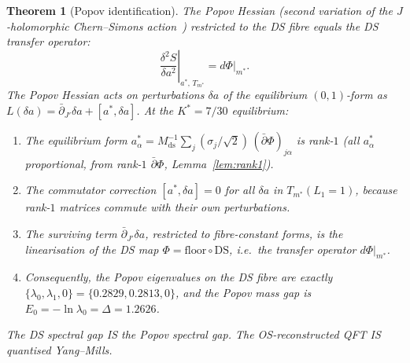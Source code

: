 \documentclass[11pt,a4paper]{article}
\newtheorem{theorem}{Theorem}[section]
\theoremstyle{definition}
\theoremstyle{remark}
\newcommand{\dbar}{\bar{\partial}}
\begin{document}
\begin{theorem}[Popov identification]\label{thm:popov_identification}
The Popov Hessian (second variation of the $J$-holomorphic Chern--Simons action~\cite{Popov2021}) restricted to the DS fibre equals the DS transfer operator:
\[
\left.\frac{\delta^2 S}{\delta a^2}\right|_{a^*,\,T_{m^*}} = d\Phi\big|_{m^*}.
\]
The Popov Hessian acts on perturbations $\delta a$ of the equilibrium $(0,1)$-form as $L(\delta a)=\dbar_{J'}\delta a+[a^*,\delta a]$. At the $K^*=7/30$ equilibrium:
\begin{enumerate}[nosep]
\item The equilibrium form $a^*_\alpha=M_{\mathrm{ds}}^{-1}\sum_j(\sigma_j/\sqrt{2})\,(\dbar\Phi)_{j\alpha}$ is rank-$1$ (all $a^*_\alpha$ proportional, from rank-$1$ $\dbar\Phi$, Lemma~\ref{lem:rank1}).
\item The commutator correction $[a^*,\delta a]=0$ for all $\delta a$ in $T_{m^*}(L_1=1)$, because rank-$1$ matrices commute with their own perturbations.
\item The surviving term $\dbar_{J'}\delta a$, restricted to fibre-constant forms, is the linearisation of the DS map $\Phi=\mathrm{floor}\circ\mathrm{DS}$, i.e.\ the transfer operator $d\Phi|_{m^*}$.
\item Consequently, the Popov eigenvalues on the DS fibre are exactly $\{\lambda_0,\lambda_1,0\}=\{0.2829,0.2813,0\}$, and the Popov mass gap is $E_0=-\ln\lambda_0=\Delta=1.2626$.
\end{enumerate}
The DS spectral gap IS the Popov spectral gap. The OS-reconstructed QFT IS quantised Yang--Mills.
\end{theorem}
\end{document}
